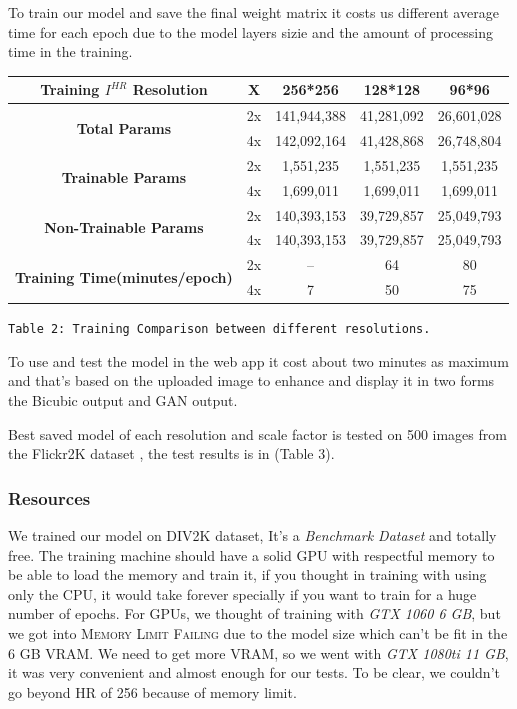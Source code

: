 \documentclass[12pt]{article}
\begin{document}
				To train our model and save the final weight matrix it costs us different average time for each epoch due to the model layers sizie and the amount of processing time in the training.
				\begin{center}
					\vspace{0.4in}
					\begin{tabular}{c|c|c|c|c}
						\textbf{Training $I^{HR}$ Resolution} & X & \textbf{256*256} & \textbf{128*128} & \textbf{96*96} \\\hline
						\multirow{2}{*}{\textbf{Total Params}} & 2x & 141,944,388 & 41,281,092 & 26,601,028 \\\cline{2-5} & 4x & 142,092,164 & 41,428,868 & 26,748,804\\\hline
						\multirow{2}{*}{\textbf{Trainable Params}} & 2x & 1,551,235 & 1,551,235 & 1,551,235 \\\cline{2-5} & 4x & 1,699,011 & 1,699,011 & 1,699,011\\\hline
						\multirow{2}{*}{\textbf{Non-Trainable Params}} & 2x & 140,393,153 & 39,729,857 & 25,049,793 \\\cline{2-5} & 4x & 140,393,153 & 39,729,857 & 25,049,793\\\hline
						\multirow{2}{*}{\textbf{Training Time(minutes/epoch)}} & 2x & -- & 64 & 80 \\\cline{2-5} & 4x & 7 & 50 & 75
					\end{tabular}
					\vspace{0.2in}
					
					\texttt{Table 2: Training Comparison between different resolutions.}
					\vspace{0.1in}
				\end{center}
				
				To use and test the model in the web app it cost about two minutes as maximum and that’s based on the uploaded image to enhance and display it in two forms the Bicubic output and GAN output.
				
				Best saved model of each resolution and scale factor is tested on 500 images from the Flickr2K dataset \cite{31}, the test results is in (Table 3).
			\subsubsection{Resources}
				We trained our model on DIV2K \cite{29} dataset, It’s a \textit{Benchmark Dataset} and totally free. The training machine should have a solid GPU with respectful memory to be able to load the memory and train it, if you thought in training with using only the CPU, it would take forever specially if you want to train for a huge number of epochs. For GPUs, we thought of training with \textit{GTX 1060 6 GB}, but we got into \textsc{Memory Limit Failing} due to the model size which can't be fit in the 6 GB VRAM. We need to get more VRAM, so we went with \textit{GTX 1080ti 11 GB}, it was very convenient and almost enough for our tests. To be clear, we couldn't go beyond HR of 256 because of memory limit.
				
\end{document}
